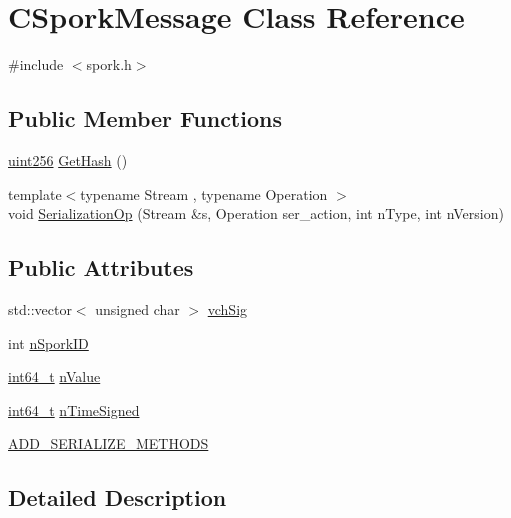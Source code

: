 \hypertarget{class_c_spork_message}{}\section{C\+Spork\+Message Class Reference}
\label{class_c_spork_message}


{\ttfamily \#include $<$spork.\+h$>$}

\subsection*{Public Member Functions}
\begin{DoxyCompactItemize}
\item 
\hyperlink{classuint256}{uint256} \hyperlink{class_c_spork_message_aa71d5976465a8edb3f11901b14b9df65}{Get\+Hash} ()
\item 
{\footnotesize template$<$typename Stream , typename Operation $>$ }\\void \hyperlink{class_c_spork_message_a9c8cdb184cb0f7ddcf490eb9efe147ec}{Serialization\+Op} (Stream \&s, Operation ser\+\_\+action, int n\+Type, int n\+Version)
\end{DoxyCompactItemize}
\subsection*{Public Attributes}
\begin{DoxyCompactItemize}
\item 
std\+::vector$<$ unsigned char $>$ \hyperlink{class_c_spork_message_a23740331f22a1ed4a8af5a299a618cc1}{vch\+Sig}
\item 
int \hyperlink{class_c_spork_message_a081216533339aed53adbb0dad2a78f73}{n\+Spork\+I\+D}
\item 
\hyperlink{stdint_8h_adec1df1b8b51cb32b77e5b86fff46471}{int64\+\_\+t} \hyperlink{class_c_spork_message_ae15a1fa999993177b2549c4316c89643}{n\+Value}
\item 
\hyperlink{stdint_8h_adec1df1b8b51cb32b77e5b86fff46471}{int64\+\_\+t} \hyperlink{class_c_spork_message_a66a80692ffda8526efa272bb2847030b}{n\+Time\+Signed}
\item 
\hyperlink{class_c_spork_message_afcbd5a0f8bdeebe3794088bf29136071}{A\+D\+D\+\_\+\+S\+E\+R\+I\+A\+L\+I\+Z\+E\+\_\+\+M\+E\+T\+H\+O\+D\+S}
\end{DoxyCompactItemize}


\subsection{Detailed Description}


